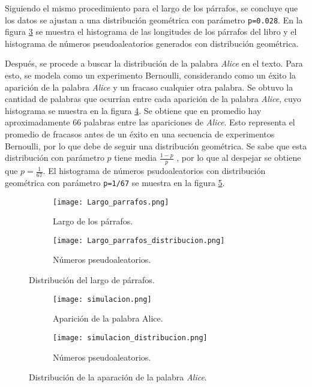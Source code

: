 \documentclass[12pt,letterpaper]{article}
\begin{document}
Siguiendo el mismo procedimiento para el largo de los párrafos, se concluye que los datos se ajustan a una distribución geométrica con parámetro \texttt{p=0.028}. En la figura \ref{largoparrafos} se muestra el histograma de las longitudes de los párrafos del libro y el histograma de números pseudoaleatorios generados con distribución geométrica.

Después, se procede a buscar la distribución de la palabra \textit{Alice} en el texto. Para esto, se modela como un experimento Bernoulli, considerando como un éxito la aparición de la palabra \textit{Alice} y un fracaso cualquier otra palabra. Se obtuvo la cantidad de palabras que ocurrían entre cada aparición de la palabra \textit{Alice}, cuyo histograma se muestra en la figura \ref{alice}. Se obtiene que en promedio hay aproximadamente 66 palabras entre las apariciones de \textit{Alice}. Esto representa el promedio de fracasos antes de un éxito en una secuencia de experimentos Bernoulli, por lo que debe de seguir una distribución geométrica. Se sabe que esta distribución con parámetro $p$ tiene media $\frac{1-p}{p}$ \cite{casella}, por lo que al despejar se obtiene que $p=\frac{1}{67}. $ El histograma de números psudoaleatorios con distribución geométrica con parámetro \texttt{p=1/67} se muestra en la figura \ref{simalice}.

\begin{figure}
 	\centering
 	\begin{subfigure}[b]{0.45\linewidth}
 		\texttt{[image: Largo\_parrafos.png]} 		
 		\caption{Largo de los párrafos.}
 		 	\label{parrafos}
 	\end{subfigure}
 	\begin{subfigure}[b]{0.45\linewidth}
 		\texttt{[image: Largo\_parrafos\_distribucion.png]} 		
 		\caption{Números pseudoaleatorios.}
 		\label{simparrafos}
 	\end{subfigure}
 	 	\caption{Distribución del largo de párrafos.} 
 	 	 	\label{largoparrafos}
\end{figure}




\begin{figure}
 	\centering
 
 	\begin{subfigure}[b]{0.45\linewidth}
 		\texttt{[image: simulacion.png]} 
 		 	\caption{Aparición de la palabra Alice.}
 		 		\label{alice}
 	\end{subfigure}
 	\begin{subfigure}[b]{0.45\linewidth}
 		\texttt{[image: simulacion\_distribucion.png]} 		
 		\caption{Números pseudoaleatorios.}
 		\label{simalice}
 	\end{subfigure}
 	 		\label{distAlice}
 	\caption{Distribución de la aparación de la palabra \textit{Alice}.}
\end{figure}


 

\end{document}
